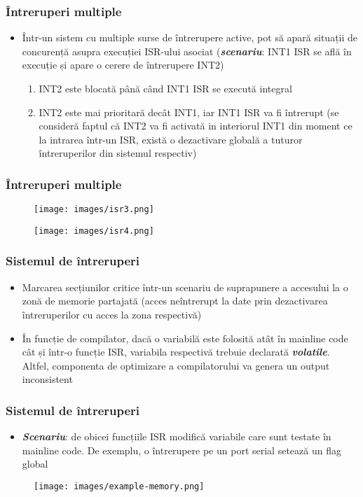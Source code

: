 \documentclass[xcolor={table}]{beamer}
\begin{document}
		\begin{frame}
			\frametitle{Întreruperi multiple}
			\begin{itemize}
				\item Într-un sistem cu multiple surse de întrerupere active, pot să apară situații de concurență asupra execuției ISR-ului asociat (\textbf{\textit{scenariu}}: INT1 ISR se află în execuție  și apare o cerere de întrerupere INT2)
				\begin{enumerate}
				    \item INT2 este blocată până când INT1 ISR se execută integral
				    \item INT2 este mai prioritară decât INT1, iar INT1 ISR va fi întrerupt (se consideră faptul că INT2 va fi activată in interiorul INT1 din moment ce la intrarea într-un ISR, există o dezactivare globală a tuturor întreruperilor din sistemul respectiv)
				\end{enumerate}
			\end{itemize}
		\end{frame}
		\begin{frame}
		    \frametitle{Întreruperi multiple}
		    \begin{figure}
		        \centering
		        \texttt{[image: images/isr3.png]}
		    \end{figure}
		    \hline
		    \begin{figure}
		        \centering
		        \texttt{[image: images/isr4.png]}
		    \end{figure}
		\end{frame}
    	\begin{frame}
    	    \frametitle{Sistemul de întreruperi}
    	    \begin{itemize}
    	        \item Marcarea secțiunilor critice într-un scenariu de suprapunere a accesului la o zonă de memorie partajată (acces neîntrerupt la date prin dezactivarea întreruperilor cu acces la zona respectivă)
    	        \item În funcție de compilator, dacă o variabilă este folosită atât în mainline code cât și într-o funcție ISR, variabila respectivă trebuie declarată \textbf{\textit{volatile}}. Altfel, componenta de optimizare a compilatorului va genera un output inconsistent
    	    \end{itemize}
    	 \end{frame}
    	 \begin{frame}
    	    \frametitle{Sistemul de întreruperi}
    	    \begin{itemize}
    	        \item \textbf{\textit{Scenariu}}: de obicei funcțiile ISR modifică variabile care sunt testate în mainline code. De exemplu, o întrerupere pe un port serial setează un flag global
    	    \end{itemize}
    	     \begin{figure}
		        \centering
		        \texttt{[image: images/example-memory.png]}
		    \end{figure}
    	 \end{frame}
\end{document}
